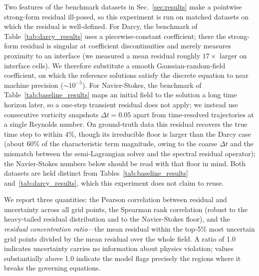 Two features of the benchmark datasets in Sec.~\ref{sec:results} make a pointwise strong-form residual
ill-posed, so this experiment is run on matched datasets on which the residual is well-defined. For Darcy,
the benchmark of Table~\ref{tab:darcy_results} uses a piecewise-constant coefficient; there the strong-form
residual is singular at coefficient discontinuities and merely measures proximity to an interface (we
measured a mean residual roughly $17\times$ larger on interface cells). We therefore substitute a
smooth Gaussian-random-field coefficient, on which the reference solutions satisfy the discrete equation to
near machine precision ($\sim\!10^{-5}$). For Navier-Stokes, the benchmark of
Table~\ref{tab:baseline_results} maps an initial field to the solution a long time horizon later, so a
one-step transient residual does not apply; we instead use consecutive vorticity snapshots
$\Delta t = 0.05$ apart from time-resolved trajectories at a single Reynolds number. On ground-truth data
this residual recovers the true time step to within $4\%$, though its irreducible floor is larger than the
Darcy case (about $60\%$ of the characteristic term magnitude, owing to the coarse $\Delta t$ and the
mismatch between the semi-Lagrangian solver and the spectral residual operator); the Navier-Stokes numbers
below should be read with that floor in mind. Both datasets are held distinct from Tables~\ref{tab:baseline_results}
and~\ref{tab:darcy_results}, which this experiment does not claim to reuse.

We report three quantities: the Pearson correlation between residual and
uncertainty across all grid points, the Spearman rank correlation (robust to the heavy-tailed residual
distribution and to the Navier-Stokes floor), and the \emph{residual concentration ratio}---the mean
residual within the top-5\% most uncertain grid points divided by the mean residual over the whole field. A
ratio of 1.0 indicates uncertainty carries no information about physics violation; values substantially
above 1.0 indicate the model flags precisely the regions where it breaks the governing equations.

